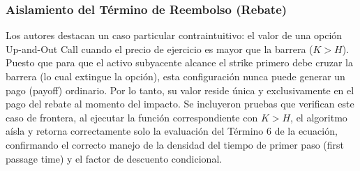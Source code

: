 \subsubsection{Aislamiento del Término de Reembolso (Rebate)}

Los autores destacan un caso particular contraintuitivo: el valor de una opción Up-and-Out Call cuando el precio de ejercicio es mayor que la barrera ($K>H$). Puesto que para que el activo subyacente alcance el strike primero debe cruzar la barrera (lo cual extingue la opción), esta configuración nunca puede generar un pago (payoff) ordinario. Por lo tanto, su valor reside única y exclusivamente en el pago del rebate al momento del impacto. Se incluyeron pruebas que verifican este caso de frontera, al ejecutar la función correspondiente con $K>H$, el algoritmo aísla y retorna correctamente solo la evaluación del Término 6 de la ecuación, confirmando el correcto manejo de la densidad del tiempo de primer paso (first passage time) y el factor de descuento condicional.
